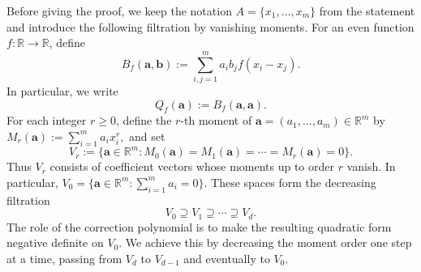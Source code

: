 \documentclass[11pt]{article}
\theoremstyle{definition}
\begin{document}
Before giving the proof, we keep the notation
\(A=\{x_1,\dots,x_m\}\) from the statement and introduce the following filtration by vanishing moments. 
For an even function \(f:\mathbb R\to\mathbb R\), define
\[
B_f(\boldsymbol{a},\boldsymbol{b})
:=
\sum_{i,j=1}^m a_i b_j f(x_i-x_j).\]
In particular, we write
\[
Q_f(\boldsymbol{a}):=B_f(\boldsymbol{a},\boldsymbol{a}).
\]
For each integer \(r\ge0\), define the \(r\)-th moment of \(\boldsymbol{a}=(a_1,\dots,a_m)\in\mathbb R^m\) by
\(
M_r(\boldsymbol{a}):=\sum_{i=1}^m a_i x_i^r,
\)
and set
\[
V_r:=\{\boldsymbol{a}\in\mathbb R^m:M_0(\boldsymbol{a})=M_1(\boldsymbol{a})=\cdots=M_r(\boldsymbol{a})=0\}.
\]
Thus \(V_r\) consists of coefficient vectors whose moments up to order \(r\) vanish.
In particular,
\(
V_0=\{\boldsymbol{a}\in\mathbb R^m:\sum_{i=1}^m a_i=0\}.
\)
These spaces form the decreasing filtration
\[
V_0\supseteq V_1\supseteq \cdots\supseteq V_d.
\]
The role of the correction polynomial is to make the resulting quadratic form negative definite on \(V_0\). 
We achieve this by decreasing the moment order one step at a time, passing from \(V_d\) to \(V_{d-1}\) and eventually to \(V_0\).
\end{document}

